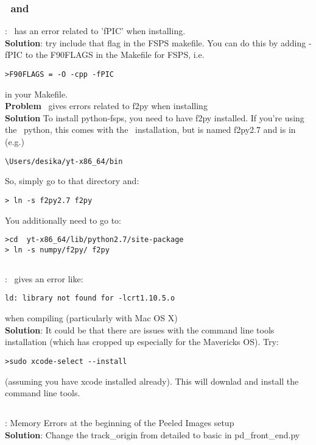 \subsubsection{\fsps \ and \fsps}

\color{red}{\bf Problem}: \color{black} \pfsps \ has an error related to 'fPIC' when installing.\\
\color{blue} {\bf Solution}: \color{black} try include that flag in the FSPS makefile. You can do this by adding -fPIC to the F90FLAGS in the Makefile for FSPS, i.e.
\begin{verbatim}
>F90FLAGS = -O -cpp -fPIC
\end{verbatim}
in your Makefile.\\
\newline
\color{red} {\bf Problem} \color{black} \pfsps \ gives errors related to f2py when installing \\
\color{blue} {\bf Solution} \color{black} To install python-fsps, you
need to have f2py installed. If you're using the \yt \ python, this comes with the \yt \ installation, but
is named f2py2.7 and is in (e.g.)
\begin{verbatim}
\Users/desika/yt-x86_64/bin
\end{verbatim}
So, simply go to that directory and:
\begin{verbatim}
> ln -s f2py2.7 f2py
\end{verbatim}
You additionally need to go to: 
\begin{verbatim}
>cd  yt-x86_64/lib/python2.7/site-package
> ln -s numpy/f2py/ f2py
\end{verbatim}


\subsection{\hyperion}

\color{red}{\bf Problem}: \color{black} \hyperion \ gives an error like:
\begin{verbatim}
ld: library not found for -lcrt1.10.5.o
\end{verbatim}
when compiling (particularly with Mac OS X)\\
\color{blue} {\bf Solution}: \color{black} It could be that there are issues with the command line tools installation (which has cropped up especially for the Mavericks OS).  Try:
\begin{verbatim}
>sudo xcode-select --install
\end{verbatim}
(assuming you have xcode installed already).  This will downlad and
install the command line tools.

\subsection{\pd}
\color{red}{\bf Problem}: \color{black} Memory Errors at the beginning of the Peeled Images setup\\
\color{blue} {\bf Solution}: \color{black} Change the track\_origin from detailed to basic in pd\_front\_end.py

